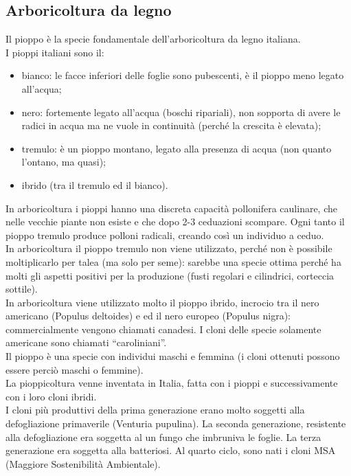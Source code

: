 \subsection{Arboricoltura da legno}
Il pioppo è la specie fondamentale dell'arboricoltura da legno italiana.\\
I pioppi italiani sono il:
\begin{itemize}[nosep]
    \item bianco: le facce inferiori delle foglie sono pubescenti, è il pioppo meno legato all'acqua;
    \item nero: fortemente legato all'acqua (boschi ripariali), non sopporta di avere le radici in acqua ma ne vuole in continuità (perché la crescita è elevata);
    \item tremulo: è un pioppo montano, legato alla presenza di acqua (non quanto l'ontano, ma quasi);
    \item ibrido (tra il tremulo ed il bianco).
\end{itemize}
In arboricoltura i pioppi hanno una discreta capacità pollonifera caulinare, che nelle vecchie piante non esiste e che dopo 2-3 ceduazioni scompare. Ogni tanto il pioppo tremulo produce polloni radicali, creando così un individuo a ceduo.\\
In arboricoltura il pioppo tremulo non viene utilizzato, perché non è possibile moltiplicarlo per talea (ma solo per seme): sarebbe una specie ottima perché ha molti gli aspetti positivi per la produzione (fusti regolari e cilindrici, corteccia sottile).\\
In arboricoltura viene utilizzato molto il pioppo ibrido, incrocio tra il nero americano (Populus deltoides) e ed il nero europeo (Populus nigra): commercialmente vengono chiamati canadesi. I cloni delle specie solamente americane sono chiamati ``caroliniani''.\\
Il pioppo è una specie con individui maschi e femmina (i cloni ottenuti possono essere perciò maschi o femmine).\\
La pioppicoltura venne inventata in Italia, fatta con i pioppi e successivamente con i loro cloni ibridi.\\
I cloni più produttivi della prima generazione erano molto soggetti alla defogliazione primaverile (Venturia pupulina). La seconda generazione, resistente alla defogliazione era soggetta al un fungo che imbruniva le foglie. La terza generazione era soggetta alla batteriosi. Al quarto ciclo, sono nati i cloni MSA (Maggiore Sostenibilità Ambientale).\\
